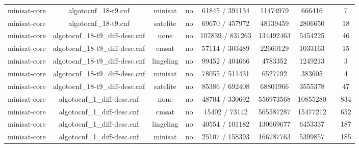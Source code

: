 \begin{appendices}
\begin{table}[p]
\begin{center}
\begin{tabular}{l|cccccccc}
  minisat-core                   & algotocnf\_18-t9.cnf           & minisat    & no    & 61845 / 391134 & 11474979  & 666416    &            & 7 \\ %
  minisat-core                   & algotocnf\_18-t9.cnf           & satelite   & no    & 69670 / 457972 & 48139459  & 2806650   &            & 18 \\ %
  minisat-core                   & algotocnf\_18-t9\_diff-desc.cnf & none       & no    & 107839 / 831263 & 134492463 & 5454225   &            & 46 \\ %
  minisat-core                   & algotocnf\_18-t9\_diff-desc.cnf & cmsat      & no    & 57114 / 303489 & 22660129  & 1033163   &            & 15 \\ %
  minisat-core                   & algotocnf\_18-t9\_diff-desc.cnf & lingeling  & no    & 99452 / 404666 & 4783352   & 1249213   &            & 3 \\ %
  minisat-core                   & algotocnf\_18-t9\_diff-desc.cnf & minisat    & no    & 78055 / 511431 & 6527792   & 383605    &            & 4 \\ %
  minisat-core                   & algotocnf\_18-t9\_diff-desc.cnf & satelite   & no    & 85386 / 692408 & 68801966  & 3555378   &            & 47 \\ %
  minisat-core                   & algotocnf\_1\_diff-desc.cnf    & none       & no    & 48704 / 330692 & 556973568 & 10855280  &            & 834 \\ %
  minisat-core                   & algotocnf\_1\_diff-desc.cnf    & cmsat      & no    & 15402 / 73142 & 565587287 & 15477212  &            & 652 \\ %
  minisat-core                   & algotocnf\_1\_diff-desc.cnf    & lingeling  & no    & 40554 / 101182 & 130669677 & 6453337   &            & 187 \\ %
  minisat-core                   & algotocnf\_1\_diff-desc.cnf    & minisat    & no    & 25107 / 158393 & 166787763 & 5399857   &            & 185 \\ %

\end{tabular}
\end{center}
\end{table}
\end{appendices}
